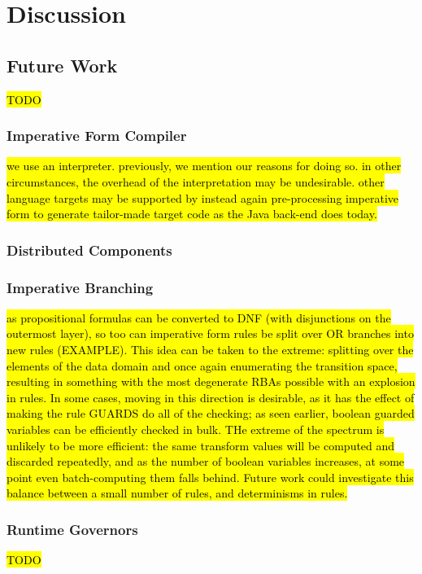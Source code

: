\chapter{Discussion}
\label{sec:discussion}
\section{Future Work}
\hl{TODO}
\subsection{Imperative Form Compiler}
\hl{we use an interpreter. previously, we mention our reasons for doing so. in other circumstances, the overhead of the interpretation may be undesirable. other language targets may be supported by instead again pre-processing imperative form to generate tailor-made target code as the Java back-end does today.}
\subsection{Distributed Components}
\subsection{Imperative Branching}
\hl{as propositional formulas can be converted to DNF (with disjunctions on the outermost layer), so too can imperative form rules be split over OR branches into new rules (EXAMPLE). This idea can be taken to the extreme: splitting over the elements of the data domain and once again enumerating the transition space, resulting in something with the most degenerate RBAs possible with an explosion in rules. In some cases, moving in this direction is desirable, as it has the effect of making the rule GUARDS do all of the checking; as seen earlier, boolean guarded variables can be efficiently checked in bulk. THe extreme of the spectrum is unlikely to be more efficient: the same transform values will be computed and discarded repeatedly, and as the number of boolean variables increases, at some point even batch-computing them falls behind. Future work could investigate this balance between a small number of rules, and determinisms in rules.}
\subsection{Runtime Governors}
\hl{TODO}
